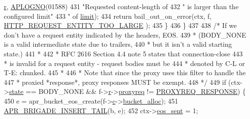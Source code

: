 \begin{DoxyCode}
{{      \hyperlink{structap__filter__t_a2d6537780c4059697c1f168a1121d62c}{r}, \hyperlink{group__APACHE__CORE__LOG_ga1dee8a07e06bc5b3de8b89662c2cd666}{APLOGNO}(01588)
431                           \textcolor{stringliteral}{"Requested content-length of %
432                           \textcolor{stringliteral}{" is larger than the configured limit"}
433                           \textcolor{stringliteral}{" of %
      \hyperlink{structhttp__filter__ctx_ae3dfd19fe37ee4d2d690ca352f6d8601}{limit});
434                 \textcolor{keywordflow}{return} bail\_out\_on\_error(ctx, f, \hyperlink{group__HTTP__Status_ga93fd8ea184f2b91b69c000f86d2e35bf}{HTTP\_REQUEST\_ENTITY\_TOO\_LARGE}
      );
435             \}
436         \}
437 
438         \textcolor{comment}{/* If we don't have a request entity indicated by the headers, EOS.}
439 \textcolor{comment}{         * (BODY\_NONE is a valid intermediate state due to trailers,}
440 \textcolor{comment}{         *  but it isn't a valid starting state.)}
441 \textcolor{comment}{         *}
442 \textcolor{comment}{         * RFC 2616 Section 4.4 note 5 states that connection-close}
443 \textcolor{comment}{         * is invalid for a request entity - request bodies must be}
444 \textcolor{comment}{         * denoted by C-L or T-E: chunked.}
445 \textcolor{comment}{         *}
446 \textcolor{comment}{         * Note that since the proxy uses this filter to handle the}
447 \textcolor{comment}{         * proxied *response*, proxy responses MUST be exempt.}
448 \textcolor{comment}{         */}
449         \textcolor{keywordflow}{if} (ctx->\hyperlink{structhttp__filter__ctx_a2e84a1c737dd4daa565b328c875402cb}{state} == BODY\_NONE && f->\hyperlink{structap__filter__t_a2d6537780c4059697c1f168a1121d62c}{r}->\hyperlink{structrequest__rec_a82ca03c6dcfcacbf7001ff85e462289d}{proxyreq} != 
      \hyperlink{group__ProxyReq_gaedfe04be933e20251ce580aa6b15d864}{PROXYREQ\_RESPONSE}) \{
450             e = apr\_bucket\_eos\_create(f->\hyperlink{structap__filter__t_afb039953f0c62d8455aa9f4bdd3ef487}{c}->\hyperlink{structconn__rec_a5a9ee4911c5a655131f76a04036fb4c0}{bucket\_alloc});
451             \hyperlink{group__APR__Util__Bucket__Brigades_ga5447595f8374296c5ffe208db39b2f5d}{APR\_BRIGADE\_INSERT\_TAIL}(b, e);
452             ctx->\hyperlink{structhttp__filter__ctx_aaf41999f4964aefe0f6947e7482e644f}{eos\_sent} = 1;
}}}}
\end{DoxyCode}
